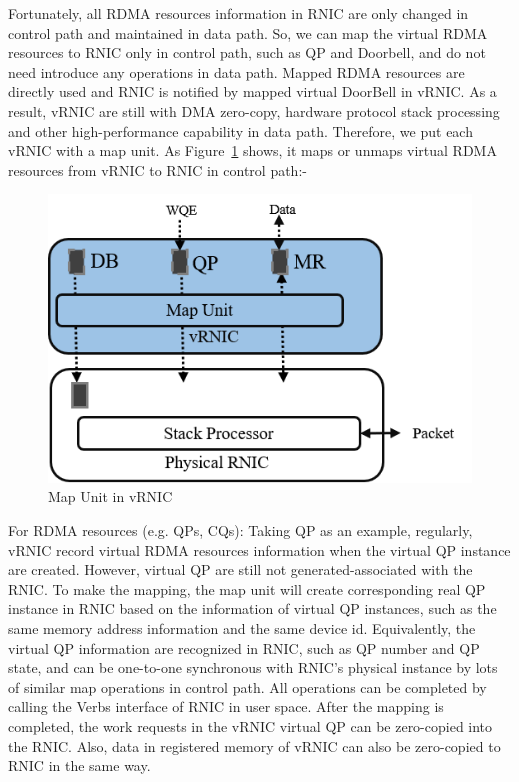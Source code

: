 Fortunately, all RDMA resources information in RNIC are only changed in control path and maintained in data path. So, we can map the virtual RDMA resources to RNIC only in control path, such as QP and Doorbell,  and do not need introduce any operations in data path. Mapped RDMA resources are directly used and RNIC is notified by mapped virtual DoorBell in vRNIC. As a result, vRNIC are still with DMA zero-copy, hardware protocol stack processing and other high-performance capability in data path. Therefore, we put each vRNIC with a map unit. As Figure~\ref{fig:map-unit} shows, it maps or unmaps virtual RDMA resources from vRNIC to RNIC in control path:-


\begin{figure}[!ht]
	\centering
	\includegraphics[width=0.9\linewidth]{images/map-unit}
	\caption{Map Unit in vRNIC}
	\label{fig:map-unit}
\end{figure}

For RDMA resources (e.g. QPs, CQs): Taking QP as an example, regularly, vRNIC record virtual RDMA resources information when the virtual QP instance are created. However, virtual QP are still not generated-associated with the RNIC. To make the mapping, the map unit will create corresponding real QP instance in RNIC based on the information of virtual QP instances, such as the same memory address information and the same device id. Equivalently, the virtual QP information are recognized in RNIC, such as QP number and QP state, and can be one-to-one synchronous with RNIC’s physical instance by lots of similar map operations in control path. All operations can be completed by calling the Verbs interface of RNIC in user space. After the mapping is completed, the work requests in the vRNIC virtual QP can be zero-copied into the RNIC. Also, data in registered memory of vRNIC can also be zero-copied to RNIC in the same way. 

